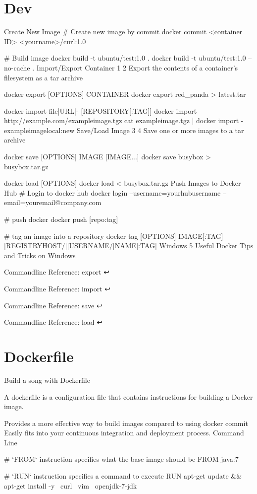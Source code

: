 \section{Dev}

Create New Image
# Create new image by commit
docker commit <container ID> <yourname>/curl:1.0

# Build image
docker build -t ubuntu/test:1.0 .
docker build -t ubuntu/test:1.0 --no-cache .
Import/Export Container 1 2
Export the contents of a container's filesystem as a tar archive

docker export [OPTIONS] CONTAINER
docker export red_panda > latest.tar

docker import file|URL|- [REPOSITORY[:TAG]]
docker import http://example.com/exampleimage.tgz
cat exampleimage.tgz | docker import - exampleimagelocal:new
Save/Load Image 3 4
Save one or more images to a tar archive

docker save [OPTIONS] IMAGE [IMAGE...]
docker save busybox > busybox.tar.gz

docker load [OPTIONS]
docker load < busybox.tar.gz
Push Images to Docker Hub
# Login to docker hub
docker login --username=yourhubusername --email=youremail@company.com

# push docker
docker push [repo:tag]

# tag an image into a repository
docker tag [OPTIONS] IMAGE[:TAG] [REGISTRYHOST/][USERNAME/]NAME[:TAG]
Windows
5 Useful Docker Tips and Tricks on Windows

Commandline Reference: export ↩

Commandline Reference: import ↩

Commandline Reference: save ↩

Commandline Reference: load ↩

\section{Dockerfile}

Build a song with Dockerfile

A dockerfile is a configuration file that contains instructions for building a Docker image.

Provides a more effective way to build images compared to using docker commit
Easily fits into your continuous integration and deployment process.
Command Line

# `FROM` instruction specifies what the base image should be
FROM java:7

# `RUN` instruction specifies a command to execute
RUN apt-get update && apt-get install -y \
      curl \
      vim \
      openjdk-7-jdk

